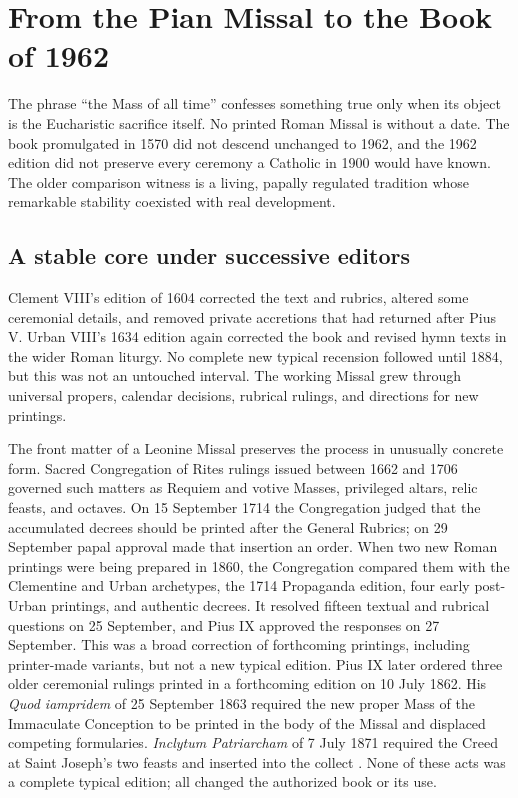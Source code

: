 \section{From the Pian Missal to the Book of 1962}

The phrase “the Mass of all time” confesses something true only when its object is the Eucharistic sacrifice itself. No printed Roman Missal is without a date. The book promulgated in 1570 did not descend unchanged to 1962, and the 1962 edition did not preserve every ceremony a Catholic in 1900 would have known. The older comparison witness is a living, papally regulated tradition whose remarkable stability coexisted with real development.

\subsection{A stable core under successive editors}

Clement VIII's edition of 1604 corrected the text and rubrics, altered some ceremonial details, and removed private accretions that had returned after Pius V. Urban VIII's 1634 edition again corrected the book and revised hymn texts in the wider Roman liturgy. No complete new typical recension followed until 1884, but this was not an untouched interval. The working Missal grew through universal propers, calendar decisions, rubrical rulings, and directions for new printings.

The front matter of a Leonine Missal preserves the process in unusually concrete form. Sacred Congregation of Rites rulings issued between 1662 and 1706 governed such matters as Requiem and votive Masses, privileged altars, relic feasts, and octaves. On 15 September 1714 the Congregation judged that the accumulated decrees should be printed after the General Rubrics; on 29 September papal approval made that insertion an order. When two new Roman printings were being prepared in 1860, the Congregation compared them with the Clementine and Urban archetypes, the 1714 Propaganda edition, four early post-Urban printings, and authentic decrees. It resolved fifteen textual and rubrical questions on 25 September, and Pius IX approved the responses on 27 September. This was a broad correction of forthcoming printings, including printer-made variants, but not a new typical edition. Pius IX later ordered three older ceremonial rulings printed in a forthcoming edition on 10 July 1862. His \emph{Quod iampridem} of 25 September 1863 required the new proper Mass of the Immaculate Conception to be printed in the body of the Missal and displaced competing formularies. \emph{Inclytum Patriarcham} of 7 July 1871 required the Creed at Saint Joseph's two feasts and inserted  into the collect . None of these acts was a complete typical edition; all changed the authorized book or its use.

